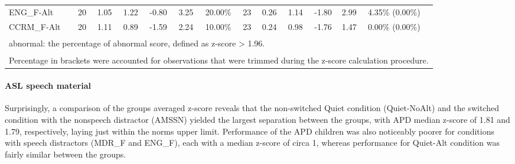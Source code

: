 \documentclass[a4paper, twoside]{templates/ociamthesis}
\begin{document}
\begin{table}
{\begin{tabular}[t]{lcccccc|>{}ccccll}
\hspace{1em}ENG\_F-Alt & 20 & 1.05 & 1.22 & -0.80 & 3.25 & 20.00\% & 23 & 0.26 & 1.14 & -1.80 & 2.99 & 4.35\% (0.00\%)\\
\hspace{1em}CCRM\_F-Alt & 20 & 1.11 & 0.89 & -1.59 & 2.24 & 10.00\% & 23 & 0.24 & 0.98 & -1.76 & 1.47 & 0.00\% (0.00\%)\\
\bottomrule
\multicolumn{13}{l}{\textsuperscript{} abnormal: the percentage of abnormal score, defined as z-score > 1.96.}\\
\multicolumn{13}{l}{\textsuperscript{} Percentage in brackets were accounted for observations that were trimmed during the z-score calculation procedure.}\\
\end{tabular}}
\end{table}

\hypertarget{asl-speech-material}{%
\paragraph*{ASL speech material}\label{asl-speech-material}}

Surprisingly, a comparison of the groups averaged z-score reveals that the non-switched Quiet condition (Quiet-NoAlt) and the switched condition with the nonspeech distractor (AMSSN) yielded the largest separation between the groups, with APD median z-score of 1.81 and 1.79, respectively, laying just within the norms upper limit. Performance of the APD children was also noticeably poorer for conditions with speech distractors (MDR\_F and ENG\_F), each with a median z-score of circa 1, whereas performance for Quiet-Alt condition was fairly similar between the groups.\\
\end{document}
